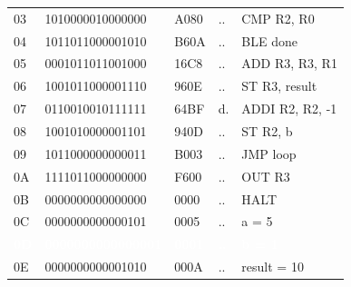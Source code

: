 \begin{tcolorbox}[stepbox, title={Instruction 16 \hfill ticks 46 to 48 \quad ST R2, b}]
{\begin{tabular}{@{}lllll@{}}
03 & 1010000010000000 & A080 & .. & CMP R2, R0\\
04 & 1011011000001010 & B60A & .. & BLE done\\
05 & 0001011011001000 & 16C8 & .. & ADD R3, R3, R1\\
06 & 1001011000001110 & 960E & .. & ST R3, result\\
07 & 0110010010111111 & 64BF & d. & ADDI R2, R2, -1\\
08 & 1001010000001101 & 940D & .. & ST R2, b\\
\rowcolor{pcc}09 & 1011000000000011 & B003 & .. & JMP loop\\
0A & 1111011000000000 & F600 & .. & OUT R3\\
0B & 0000000000000000 & 0000 & .. & HALT\\
\rowcolor{datac}0C & 0000000000000101 & 0005 & .. & a = 5\\
\rowcolor{wrt}\textcolor{white}{\textbf{0D}} & \textcolor{white}{\textbf{0000000000000001}} & \textcolor{white}{\textbf{0001}} & \textcolor{white}{\textbf{..}} & \textcolor{white}{\textbf{b = 1}}\\
\rowcolor{datac}0E & 0000000000001010 & 000A & .. & result = 10\\
\end{tabular}}
\end{tcolorbox}\par\vspace{3pt}
